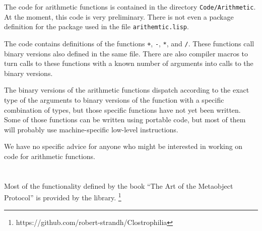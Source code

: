 The code for arithmetic functions is contained in the directory
\texttt{Code/Arithmetic}.  At the moment, this code is very
preliminary.  There is not even a package definition for the package
used in the file \texttt{arithemtic.lisp}.

The code contains definitions of the functions \texttt{+}, \texttt{-},
\texttt{*}, and \texttt{/}.  These functions call binary versions also
defined in the same file.  There are also compiler macros to turn
calls to these functions with a known number of arguments into calls
to the binary versions.

The binary versions of the arithmetic functions dispatch according to
the exact type of the arguments to binary versions of the function
with a specific combination of types, but those specific functions
have not yet been written.  Some of those functions can be written
using portable code, but most of them will probably use
machine-specific low-level instructions. 

We have no specific advice for anyone who might be interested in
working on code for arithmetic functions.  

\section{\clos{}}
\label{sec-clos}

Most of the functionality defined by the book ``The Art of the
Metaobject Protocol'' is provided by the \clostrophilia{} library.%
\footnote{https://github.com/robert-strandh/Clostrophilia}



